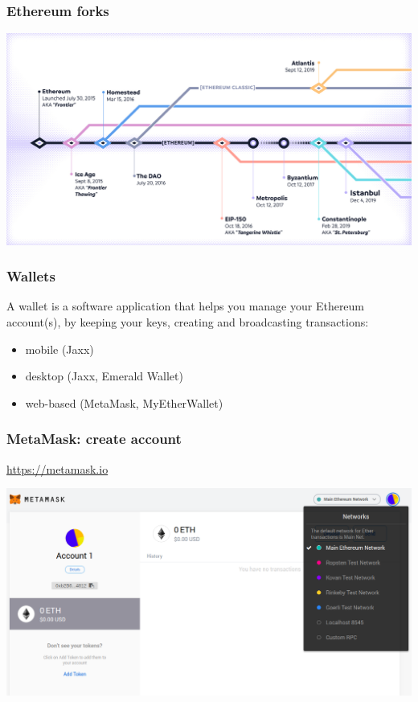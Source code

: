 \documentclass[11pt]{beamer}  %
\begin{document}
\begin{frame}\frametitle{Ethereum forks}

  \begin{center}
    \includegraphics[width=\textwidth,clip=false]{pictures/ethereum-forks.jpg}
  \end{center}

\end{frame}

\begin{frame}\frametitle{Wallets}

  \begin{greenbox}{}
    A wallet is a
    software application that helps you manage your Ethereum account(s),
    by keeping your keys, creating and broadcasting transactions:
    \begin{itemize}
    \item mobile (Jaxx)
    \item desktop (Jaxx, Emerald Wallet)
    \item web-based (MetaMask, MyEtherWallet)
    \end{itemize}
  \end{greenbox}

\end{frame}

\begin{frame}\frametitle{MetaMask: create account}

  \url{https://metamask.io}
  \begin{center}
    \includegraphics[width=\textwidth,clip=false]{pictures/metamask-account.png}
  \end{center}

\end{frame}
\end{document}
